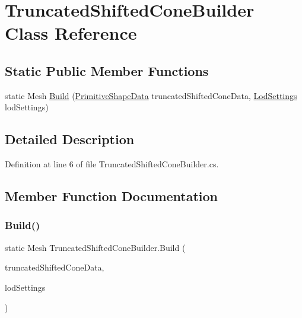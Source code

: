 \hypertarget{class_truncated_shifted_cone_builder}{}\section{Truncated\+Shifted\+Cone\+Builder Class Reference}
\label{class_truncated_shifted_cone_builder}
\subsection*{Static Public Member Functions}
\begin{DoxyCompactItemize}
\item 
static Mesh \mbox{\hyperlink{class_truncated_shifted_cone_builder_a491e43c76ee1baa3132d6114c48aaa69}{Build}} (\mbox{\hyperlink{class_primitive_shape_data}{Primitive\+Shape\+Data}} truncated\+Shifted\+Cone\+Data, \mbox{\hyperlink{class_lod_settings}{Lod\+Settings}} lod\+Settings)
\end{DoxyCompactItemize}


\subsection{Detailed Description}


Definition at line 6 of file Truncated\+Shifted\+Cone\+Builder.\+cs.



\subsection{Member Function Documentation}
\mbox{\label{class_truncated_shifted_cone_builder_a491e43c76ee1baa3132d6114c48aaa69}} 
\subsubsection{\texorpdfstring{Build()}{Build()}}
{\footnotesize\ttfamily static Mesh Truncated\+Shifted\+Cone\+Builder.\+Build (\begin{DoxyParamCaption}\item[{\mbox{\hyperlink{class_primitive_shape_data}{Primitive\+Shape\+Data}}}]{truncated\+Shifted\+Cone\+Data,  }\item[{\mbox{\hyperlink{class_lod_settings}{Lod\+Settings}}}]{lod\+Settings }\end{DoxyParamCaption})\hspace{0.3cm}{\ttfamily [static]}}



